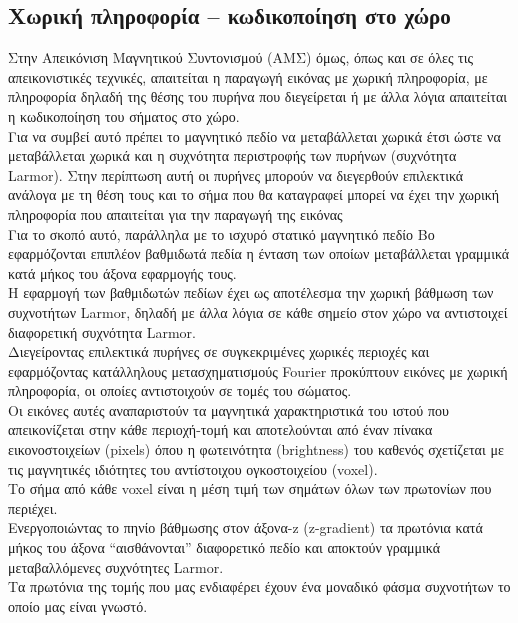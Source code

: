 \documentclass{article}
\begin{document}
\subsection{Χωρική	πληροφορία	–	κωδικοποίηση	στο	χώρο	}
Στην	Απεικόνιση	Μαγνητικού	Συντονισμού	(ΑΜΣ)	όμως,	όπως	και	
σε	 όλες	 τις	 απεικονιστικές	 τεχνικές,	 απαιτείται	 η	 παραγωγή	
εικόνας	 με	 χωρική	 πληροφορία,	 με	 πληροφορία	 δηλαδή	 της	
θέσης	του	πυρήνα	που	διεγείρεται	ή	με	άλλα	λόγια	απαιτείται	η	
κωδικοποίηση	του	σήματος	στο	χώρο.	\\
Για	να	συμβεί	αυτό	πρέπει	το	μαγνητικό	πεδίο	να	μεταβάλλεται	
χωρικά	 έτσι	 ώστε	 να	 μεταβάλλεται	 χωρικά	 και	 η	 συχνότητα	
περιστροφής	 των	πυρήνων	 (συχνότητα	Larmor).	Στην	περίπτωση	
αυτή	οι	πυρήνες	μπορούν	να	διεγερθούν	επιλεκτικά	ανάλογα	με	
τη	θέση	τους	και	το	σήμα	που	θα	καταγραφεί	μπορεί	να	έχει	την	
χωρική	 πληροφορία	 που	 απαιτείται	 για	 την	 παραγωγή	 της	
εικόνας \\
Για	 το	 σκοπό	 αυτό,	 παράλληλα	 με	 το	 ισχυρό	
στατικό	 μαγνητικό	 πεδίο	 Βο	 εφαρμόζονται	
επιπλέον	 βαθμιδωτά	 πεδία	 η	 ένταση	 των	
οποίων	 μεταβάλλεται	 γραμμικά	 κατά	 μήκος	
του	άξονα	εφαρμογής	τους.	\\
H	 εφαρμογή	 των	 βαθμιδωτών	 πεδίων	
έχει	 ως	 αποτέλεσμα	 την	 χωρική	
βάθμωση	 των	 συχνοτήτων	 Larmor,	
δηλαδή	με	άλλα	λόγια	σε	κάθε	σημείο	
στον	 χώρο	 να	 αντιστοιχεί	 διαφορετική	
συχνότητα	Larmor.	\\
Διεγείροντας	 επιλεκτικά	 πυρήνες	 σε	 συγκεκριμένες	 χωρικές	 περιοχές	
και	εφαρμόζοντας	κατάλληλους	μετασχηματισμούς	Fourier	προκύπτουν	
εικόνες	 με	 χωρική	 πληροφορία,	 οι	 οποίες	 αντιστοιχούν	 σε	 τομές	 του	
σώματος.	\\
Οι	εικόνες	αυτές	αναπαριστούν	τα	μαγνητικά	χαρακτηριστικά	του	ιστού	
που	απεικονίζεται	στην	κάθε	περιοχή-τομή	και	αποτελούνται	από	έναν	
πίνακα	 εικονοστοιχείων	 (pixels)	 όπου	 η	 φωτεινότητα	 (brightness)	 του	
καθενός	 σχετίζεται	 με	 τις	 μαγνητικές	 ιδιότητες	 του	 αντίστοιχου	
ογκοστοιχείου	(voxel).	 \\
Το	 σήμα	 από	 κάθε	 voxel	 είναι	 η	 μέση	 τιμή	 των	 σημάτων	 όλων	 των	
πρωτονίων	που	περιέχει.	\\
Ενεργοποιώντας	το	πηνίο	βάθμωσης	στον	άξονα-z	 (z-gradient)	
τα	πρωτόνια	κατά	μήκος	του	άξονα	“αισθάνονται”	διαφορετικό	
πεδίο	 και	 αποκτούν	 γραμμικά	 μεταβαλλόμενες	 συχνότητες	
Larmor.	\\
Τα	 πρωτόνια	 της	 τομής	 που	 μας	 ενδιαφέρει	 έχουν	 ένα	
μοναδικό	φάσμα	συχνοτήτων	το	οποίο	μας	είναι	γνωστό.	 \\
\end{document}
